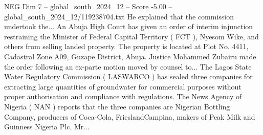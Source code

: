 \begin{textsample}{NEG Dim 7 – global\_south\_2024\_12 – Score -5.00 – global\_south\_2024\_12/119238704.txt}
He explained that the commission undertook the...
An Abuja High Court has given an order of interim injunction restraining the Minister of Federal Capital Territory ( FCT ), Nyesom Wike, and others from selling landed property.
The property is located at Plot No. 4411, Cadastral Zone A09, Guzape District, Abuja.
Justice Mohammed Zubairu made the order following an ex-parte motion moved by counsel to...
The Lagos State Water Regulatory Commission ( LASWARCO ) has sealed three companies for extracting large quantities of groundwater for commercial purposes without proper authorisation and compliance with regulations.
The News Agency of Nigeria ( NAN ) reports that the three companies are Nigerian Bottling Company, producers of Coca-Cola, FrieslandCampina, makers of Peak Milk and Guinness Nigeria Plc.
Mr...

\end{textsample}
